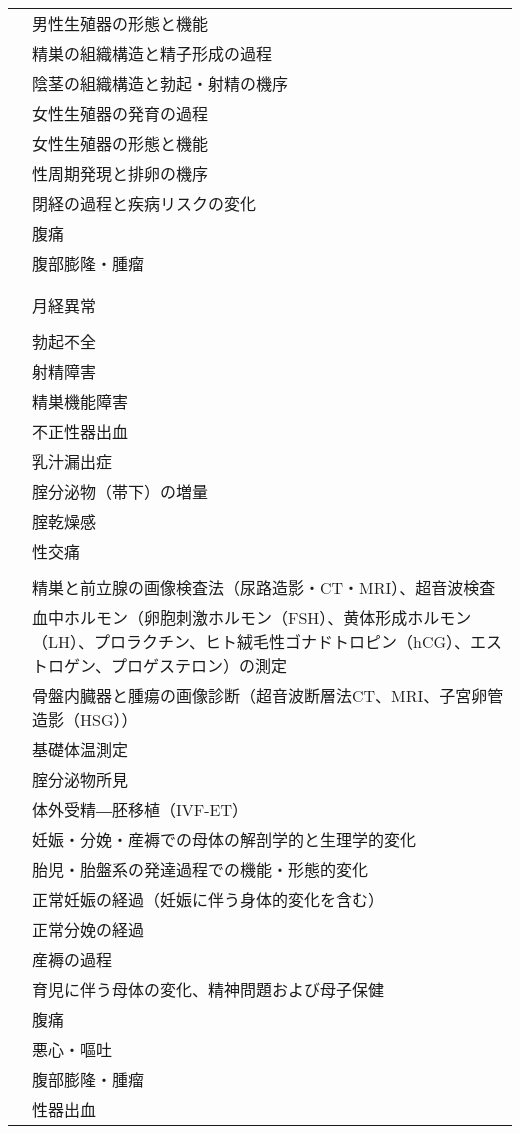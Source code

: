 \begin{xltabular}{\linewidth}{XX}
 & 男性生殖器の形態と機能 \\
 & 精巣の組織構造と精子形成の過程 \\
 & 陰茎の組織構造と勃起・射精の機序 \\
 & 女性生殖器の発育の過程 \\
 & 女性生殖器の形態と機能 \\
 & 性周期発現と排卵の機序 \\
 & 閉経の過程と疾病リスクの変化 \\
 & 腹痛 \\
 & 腹部膨隆・腫瘤 \\
 &  \\
 &  \\
 & 月経異常 \\
 &  \\
 & 勃起不全 \\
 & 射精障害 \\
 & 精巣機能障害 \\
 & 不正性器出血 \\
 & 乳汁漏出症 \\
 & 腟分泌物（帯下）の増量 \\
 & 腟乾燥感 \\
 & 性交痛 \\
 &  \\
 & 精巣と前立腺の画像検査法（尿路造影・CT・MRI）、超音波検査 \\
 & 血中ホルモン（卵胞刺激ホルモン（FSH）、黄体形成ホルモン（LH）、プロラクチン、ヒト絨毛性ゴナドトロピン（hCG）、エストロゲン、プロゲステロン）の測定 \\
 & 骨盤内臓器と腫瘍の画像診断（超音波断層法CT、MRI、子宮卵管造影（HSG）） \\
 & 基礎体温測定 \\
 & 腟分泌物所見 \\
 & 体外受精―胚移植（IVF-ET） \\
 & 妊娠・分娩・産褥での母体の解剖学的と生理学的変化 \\
 & 胎児・胎盤系の発達過程での機能・形態的変化 \\
 & 正常妊娠の経過（妊娠に伴う身体的変化を含む） \\
 & 正常分娩の経過 \\
 & 産褥の過程 \\
 & 育児に伴う母体の変化、精神問題および母子保健 \\
 & 腹痛 \\
 & 悪心・嘔吐 \\
 & 腹部膨隆・腫瘤 \\
 & 性器出血 \\

\end{xltabular}
